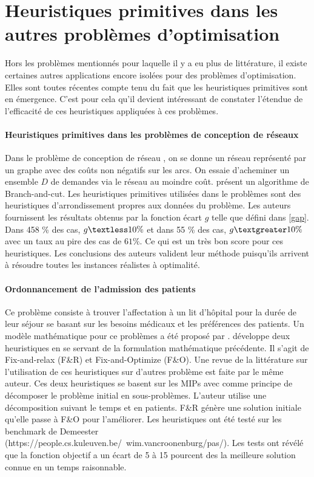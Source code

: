 \documentclass[12pt,a4paper,oneside]{book}
\theoremstyle{definition}
\begin{document}
	    
	   
	   
	   
	\section{Heuristiques primitives dans les autres problèmes d'optimisation}
	    Hors les problèmes mentionnés pour laquelle il y a eu plus de littérature, il existe certaines autres applications encore isolées pour des problèmes d'optimisation. Elles sont toutes récentes compte tenu du fait que les heuristiques primitives sont en émergence. C'est pour cela qu'il devient intéressant de constater  l'étendue de l'efficacité de ces heuristiques appliquées à ces problèmes.
	
	    \paragraph{Heuristiques primitives dans les problèmes de conception de réseaux}
	
    	   Dans le problème de conception de réseau , on se donne un réseau représenté par un graphe avec des coûts non négatifs sur les arcs. On essaie d'acheminer un ensemble $D$ de demandes via le réseau au moindre coût.\cite{buchheim2011exact} présent un algorithme de Branch-and-cut. Les heuristiques primitives utilisées dans le problèmes sont des heuristiques d'arrondissement propres aux données du problème. Les auteurs fournissent les résultats obtenus par la fonction écart $g$ telle que défini dans \ref{gap}. Dans 458 \% des cas, $g \textless 10\%$ et dans 55 \% des cas, $g \textgreater 10 \%$ avec un taux au pire des cas de $61\%$. Ce qui est un très bon score pour ces heuristiques. Les conclusions des auteurs valident leur méthode puisqu'ils arrivent à résoudre toutes les instances réalistes à optimalité.
    	
	    
	    \paragraph{Ordonnancement de l'admission des patients}
	    
	    Ce problème consiste à trouver l'affectation à un lit d'hôpital pour la durée de leur séjour se basant sur les besoins médicaux et les préférences des patients. Un modèle mathématique pour ce problèmes a été proposé par \cite{Ceschia2011}. \cite{Turhan2017} développe deux heuristiques en se servant de la formulation mathématique précédente. Il s'agit de Fix-and-relax (F\&R) et Fix-and-Optimize (F\&O). Une revue de la littérature sur l'utilisation de ces heuristiques sur d'autres problème est faite par le même auteur. Ces deux heuristiques se basent sur les MIPs avec comme principe de décomposer le problème initial en sous-problèmes. L'auteur utilise une décomposition suivant le temps et en patients. F&R génère une solution initiale qu'elle passe à F&O pour l'améliorer.
	    Les heuristiques ont été testé sur les benchmark de Demeester (https://people.cs.kuleuven.be/~wim.vancroonenburg/pas/). Les tests ont révélé que la fonction objectif a un écart de 5 à 15 pourcent des la meilleure solution connue en un temps raisonnable.  
	    
\end{document}
